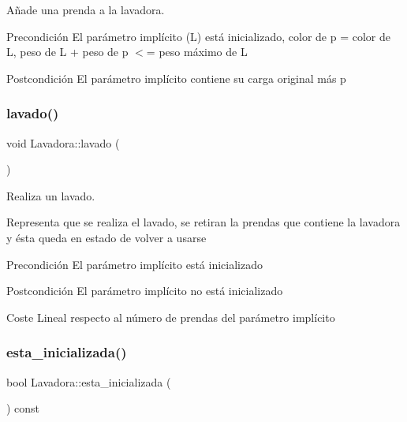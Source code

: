Añade una prenda a la lavadora. 

\begin{DoxyPrecond}{Precondición}
El parámetro implícito (L) está inicializado, color de p = color de L, peso de L + peso de p $<$= peso máximo de L 
\end{DoxyPrecond}
\begin{DoxyPostcond}{Postcondición}
El parámetro implícito contiene su carga original más p 
\end{DoxyPostcond}
\mbox{\label{class_lavadora_a82bd403e688482030fcb95f0c3fd62d1}} 
\subsubsection{\texorpdfstring{lavado()}{lavado()}}
{\footnotesize\ttfamily void Lavadora\+::lavado (\begin{DoxyParamCaption}{ }\end{DoxyParamCaption})}



Realiza un lavado. 

Representa que se realiza el lavado, se retiran la prendas que contiene la lavadora y ésta queda en estado de volver a usarse \begin{DoxyPrecond}{Precondición}
El parámetro implícito está inicializado 
\end{DoxyPrecond}
\begin{DoxyPostcond}{Postcondición}
El parámetro implícito no está inicializado 
\end{DoxyPostcond}
\begin{DoxyParagraph}{Coste Lineal respecto al número de prendas del parámetro implícito}

\end{DoxyParagraph}
\mbox{\label{class_lavadora_af081f8133ddfca2fd4f1f79575620c5a}} 
\subsubsection{\texorpdfstring{esta\+\_\+inicializada()}{esta\_inicializada()}}
{\footnotesize\ttfamily bool Lavadora\+::esta\+\_\+inicializada (\begin{DoxyParamCaption}{ }\end{DoxyParamCaption}) const}



